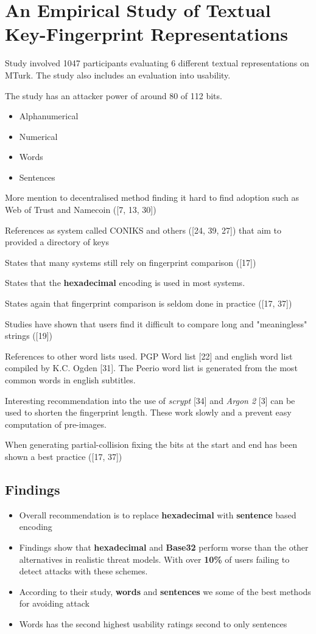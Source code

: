 \section{An Empirical Study of Textual Key-Fingerprint Representations}

Study involved 1047 participants evaluating 6 different textual representations on MTurk. The study also includes an evaluation into usability.

The study has an attacker power of around 80 of 112 bits.

\begin{itemize}
    \item Alphanumerical
    \item Numerical
    \item Words
    \item Sentences
\end{itemize}

More mention to decentralised method finding it hard to find adoption such as Web of Trust and Namecoin ([7, 13, 30])

References as system called CONIKS and others ([24, 39, 27]) that aim to provided a directory of keys

States that many systems still rely on fingerprint comparison ([17])

States that the \textbf{hexadecimal} encoding is used in most systems. 

States again that fingerprint comparison is seldom done in practice ([17, 37])

Studies have shown that users find it difficult to compare long and "meaningless" strings ([19])

References to other word lists used. PGP Word list [22] and english word list compiled by K.C. Ogden [31]. The Peerio word list is generated from the most common words in english subtitles.

Interesting recommendation into the use of \textit{scrypt} [34] and \textit{Argon 2} [3] can be used to shorten the fingerprint length. These work slowly and a prevent easy computation of pre-images.

When generating partial-collision fixing the bits at the start and end has been shown a best practice ([17, 37])

\subsection{Findings}
\begin{itemize}
    \item Overall recommendation is to replace \textbf{hexadecimal} with \textbf{sentence} based encoding
    \item Findings show that \textbf{hexadecimal} and \textbf{Base32} perform worse than the other alternatives in realistic threat models. With over \textbf{10\%} of users failing to detect attacks with these schemes.
    \item According to their study, \textbf{words} and \textbf{sentences} we some of the best methods for avoiding attack
    \item Words has the second highest usability ratings second to only sentences
\end{itemize}